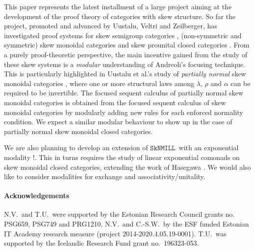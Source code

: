 \documentclass[copyright,creativecommons]{eptcs}
\theoremstyle{definition}
\newcommand{\SkNMILL}{$\mathtt{SkNMILL}$}
\begin{document}
This paper represents the latest installment of a large project aiming at the development of the proof theory of categories with skew structure. So far the project, promoted and advanced by Uustalu, Veltri and Zeilberger, has investigated proof systems for skew semigroup categories \cite{zeilberger:semiassociative:19}, (non-symmetric and symmetric) skew monoidal categories \cite{uustalu:sequent:2021,uustalu:proof:nodate,veltri:coherence:2021} and skew prounital closed categories \cite{uustalu:deductive:nodate}. From a purely proof-theoretic perspective, the main incentive gained from the study of these skew systems is a \emph{modular} understanding of Andreoli's focusing technique. This is particularly highlighted in Uustalu et al.'s study of \emph{partially normal} skew monoidal categories \cite{uustalu:proof:nodate}, where one or more structural laws among $\lambda$, $\rho$ and $\alpha$ can be required to be invertible. The focused sequent calculus of partially normal skew monoidal categories is obtained from the focused sequent calculus of skew monoidal categories by modularly adding new rules for each enforced normality condition.
We expect a similar modular behaviour to show up in the case of partially normal skew monoidal closed categories.

We are also planning to develop an extension of \SkNMILL\ with an exponential modality $!$. This in turns requires the study of linear exponential comonads on skew monoidal closed categories, extending the work of Hasegawa \cite{hasegawa:linear:2017}. We would also like to consider modalities for exchange \cite{jiang:lambek:2019} and associativity/unitality.

\paragraph{Acknowledgements} N.V.\ and T.U.\ were supported by the
Estonian Research Council grants no. \linebreak PSG659, PSG749 and PRG1210, N.V.\ and
C.-S.W.\ by the ESF funded Estonian IT Academy research measure
(project 2014-2020.4.05.19-0001). T.U.\ was supported by the Icelandic
Research Fund grant no.~196323-053.

  
  
\end{document}
